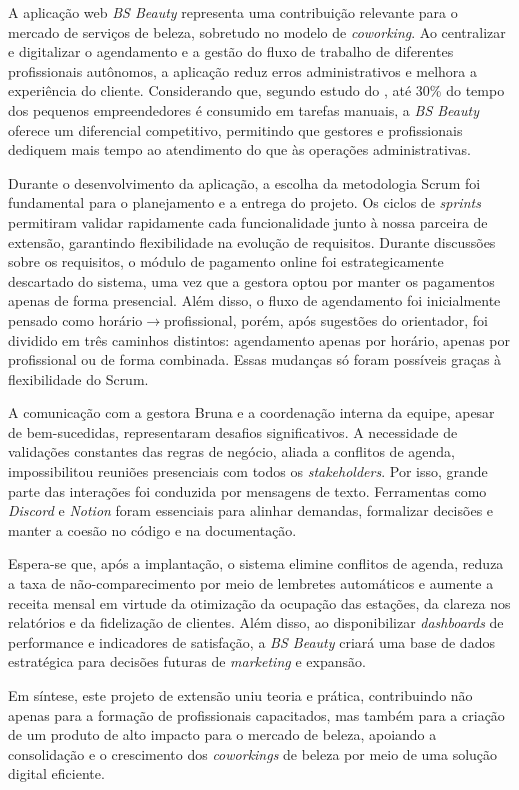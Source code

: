 

A aplicação web \emph{BS Beauty} representa uma contribuição relevante para o mercado de serviços de beleza, sobretudo no modelo de \emph{coworking}. Ao centralizar e digitalizar o agendamento e a gestão do fluxo de trabalho de diferentes profissionais autônomos, a aplicação reduz erros administrativos e melhora a experiência do cliente. Considerando que, segundo estudo do \cite{senac2022}, até 30\% do tempo dos pequenos empreendedores é consumido em tarefas manuais, a \emph{BS Beauty} oferece um diferencial competitivo, permitindo que gestores e profissionais dediquem mais tempo ao atendimento do que às operações administrativas.

Durante o desenvolvimento da aplicação, a escolha da metodologia Scrum foi fundamental para o planejamento e a entrega do projeto. Os ciclos de \emph{sprints} permitiram validar rapidamente cada funcionalidade junto à nossa parceira de extensão, garantindo flexibilidade na evolução de requisitos. Durante discussões sobre os requisitos, o módulo de pagamento online foi estrategicamente descartado do sistema, uma vez que a gestora optou por manter os pagamentos apenas de forma presencial. Além disso, o fluxo de agendamento foi inicialmente pensado como horário$\to$profissional, porém, após sugestões do orientador, foi dividido em três caminhos distintos: agendamento apenas por horário, apenas por profissional ou de forma combinada. Essas mudanças só foram possíveis graças à flexibilidade do Scrum.

A comunicação com a gestora Bruna e a coordenação interna da equipe, apesar de bem-sucedidas, representaram desafios significativos. A necessidade de validações constantes das regras de negócio, aliada a conflitos de agenda, impossibilitou reuniões presenciais com todos os \emph{stakeholders}. Por isso, grande parte das interações foi conduzida por mensagens de texto. Ferramentas como \emph{Discord} e \emph{Notion} foram essenciais para alinhar demandas, formalizar decisões e manter a coesão no código e na documentação.

Espera-se que, após a implantação, o sistema elimine conflitos de agenda, reduza a taxa de não-comparecimento por meio de lembretes automáticos e aumente a receita mensal em virtude da otimização da ocupação das estações, da clareza nos relatórios e da fidelização de clientes. Além disso, ao disponibilizar \emph{dashboards} de performance e indicadores de satisfação, a \emph{BS Beauty} criará uma base de dados estratégica para decisões futuras de \emph{marketing} e expansão.

Em síntese, este projeto de extensão uniu teoria e prática, contribuindo não apenas para a formação de profissionais capacitados, mas também para a criação de um produto de alto impacto para o mercado de beleza, apoiando a consolidação e o crescimento dos \emph{coworkings} de beleza por meio de uma solução digital eficiente.
